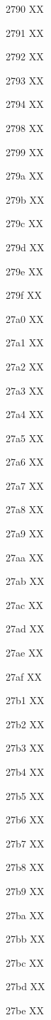 \documentclass[11pt]{article}
\begin{document}
2790 X{}X

2791 X{}X

2792 X{}X

2793 X{}X

2794 X{}X

2798 X{}X

2799 X{}X

279a X{}X

279b X{}X

279c X{}X

279d X{}X

279e X{}X

279f X{}X

27a0 X{}X

27a1 X{}X

27a2 X{}X

27a3 X{}X

27a4 X{}X

27a5 X{}X

27a6 X{}X

27a7 X{}X

27a8 X{}X

27a9 X{}X

27aa X{}X

27ab X{}X

27ac X{}X

27ad X{}X

27ae X{}X

27af X{}X

27b1 X{}X

27b2 X{}X

27b3 X{}X

27b4 X{}X

27b5 X{}X

27b6 X{}X

27b7 X{}X

27b8 X{}X

27b9 X{}X

27ba X{}X

27bb X{}X

27bc X{}X

27bd X{}X

27be X{}X
\end{document}
